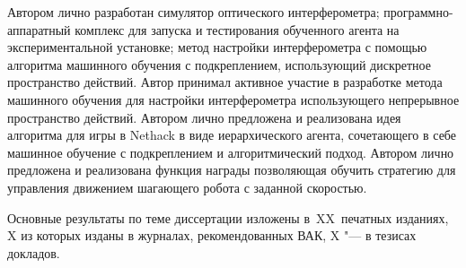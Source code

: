 {\contribution} Автором лично разработан симулятор оптического интерферометра; программно-аппаратный комплекс для запуска и тестирования обученного агента на экспериментальной установке; метод настройки интерферометра с помощью алгоритма машинного обучения с подкреплением, использующий дискретное пространство действий. Автор принимал активное участие в разработке метода машинного обучения для настройки интерферометра использующего непрерывное пространство действий. Автором лично предложена и реализована идея алгоритма для игры в Nethack в виде иерархического агента, сочетающего в себе машинное обучение с подкреплением и алгоритмический подход. Автором лично предложена и реализована функция награды позволяющая обучить стратегию для управления движением шагающего робота с заданной скоростью. 

{%
    {\publications} Основные результаты по теме диссертации изложены
    в~XX~печатных изданиях,
    X из которых изданы в журналах, рекомендованных ВАК,
    X "--- в тезисах докладов.
}%
